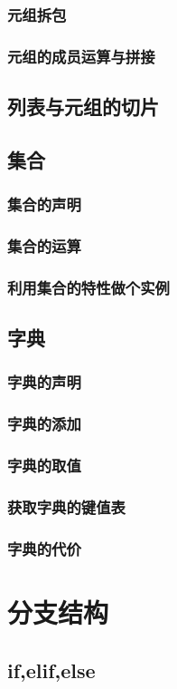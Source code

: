 \documentclass{book}
\begin{document}
\subsection{元组拆包}
\subsection{元组的成员运算与拼接}
\section{列表与元组的切片}
\section{集合}
\subsection{集合的声明}
\subsection{集合的运算}
\subsection{利用集合的特性做个实例}
\section{字典}
\subsection{字典的声明}
\subsection{字典的添加}
\subsection{字典的取值}
\subsection{获取字典的键值表}
\subsection{字典的代价}
\chapter{分支结构}
\section{if,elif,else}
\end{document}

